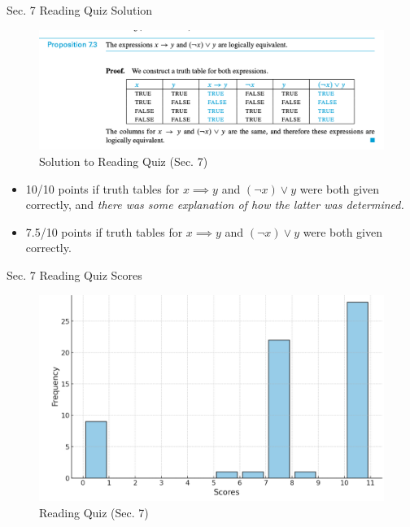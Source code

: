 \documentclass[10pt]{beamer}
\begin{document}
\begin{frame}{Sec. 7 Reading Quiz Solution}

\begin{figure}[ht]
        \centering
        \includegraphics[width=\textwidth]{images/sec_7_reading_quiz_solution}
        \caption{Solution to Reading Quiz (Sec. 7)}
        \label{fig:figure1}
\end{figure}
\pause 
\vfill 
\begin{myredbox}[title=Scoring rubric]
\footnotesize 
\begin{itemize}
\item 10/10 points if truth tables for $x \implies y$ and $(\lnot x) \lor y$ were both given correctly, and \textit{there was some explanation of how the latter was determined.}
\item 7.5/10 points if truth tables for $x \implies y$ and $(\lnot x) \lor y$ were both given correctly.  	
\end{itemize}

\end{myredbox}

\end{frame}


\begin{frame}{Sec. 7 Reading Quiz Scores}

\begin{figure}[ht]
        \centering
        \includegraphics[width=.6\textwidth]{images/sec_7_reading_scores}
        \caption{Reading Quiz (Sec. 7)}
        \label{fig:figure2}
\end{figure}



\end{frame}
\end{document}
